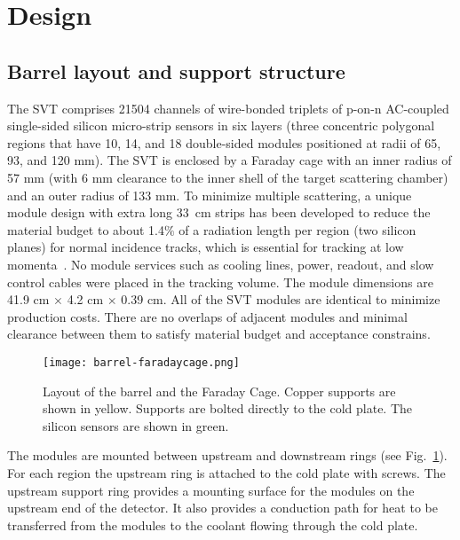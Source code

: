 \section{Design}

\subsection{Barrel layout and support structure}

The SVT comprises 21504 channels of wire-bonded triplets of p-on-n AC-coupled single-sided silicon micro-strip sensors in six layers (three concentric polygonal regions that have 10, 14, and 18 double-sided modules positioned at radii of 65, 93, and 120 mm). The SVT is enclosed by a Faraday cage with an inner radius of 57 mm (with 6 mm clearance to the inner shell of the target scattering chamber) and an outer radius of 133 mm. To minimize multiple scattering, a unique module design with extra long 33~cm strips has been developed to reduce the material budget to about 1.4$\%$ of a radiation length per region (two silicon planes) for normal incidence tracks, which is essential for tracking at low momenta~\cite{Vertex2016}. No module services such as cooling lines, power, readout, and slow control cables were placed in the tracking volume. The module dimensions are 41.9 cm $\times$ 4.2 cm $\times$ 0.39 cm. All of the SVT modules are identical to minimize production costs. There are no overlaps of adjacent modules and minimal clearance between them to satisfy material budget and acceptance constrains.

\begin{figure}[hbt] 
\centering 
\texttt{[image: barrel-faradaycage.png]}
\caption{Layout of the barrel and the Faraday Cage. Copper supports are shown in yellow.  Supports are bolted directly to the cold plate. The silicon sensors are shown in green.}
\label{fig:barrel-faradaycage}
\end{figure}



The modules  are mounted between upstream and downstream rings (see Fig.~\ref{fig:barrel-faradaycage}). For each region the upstream ring is attached to the cold plate with screws. The upstream support ring provides a mounting surface for the modules on the upstream end of the detector. It also provides a conduction path for heat to be transferred from the modules to the coolant flowing through the cold plate. 

